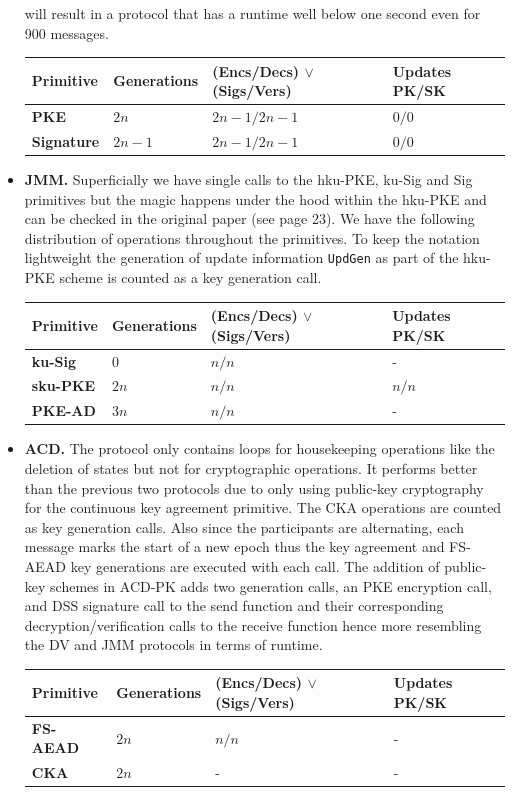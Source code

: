 \documentclass[11pt,a4paper,twoside,openright,bibliography=totoc]{scrbook}
\begin{document}
\begin{itemize}
  will result in a protocol that has a runtime well below one second
  even for 900 messages.
  \begin{center}
    \begin{tabular}{ | l | l | l | l |}
    \hline
    Primitive & Generations & (Encs/Decs) $\vee$ (Sigs/Vers) & Updates PK/SK \\ \hline
    \textbf{PKE} & $2n$ & $2n-1/2n-1$ & $0/0$ \\ \hline
    \textbf{Signature} & $2n-1$ & $2n-1/2n-1$ & $0/0$ \\  
    \hline
    \end{tabular}
  \end{center}
\item \textbf{JMM.} Superficially we have single calls to the hku-PKE, ku-Sig and
  Sig primitives but the magic happens under the hood within the hku-PKE and can
  be checked in the original paper (see page 23). We have the following distribution
  of operations throughout the primitives. To keep the notation lightweight
  the generation of update information \texttt{UpdGen} as part
  of the hku-PKE scheme is counted as a key generation call.
  \begin{center}
    \begin{tabular}{ | l | l | l | l |}
    \hline
    Primitive & Generations & (Encs/Decs) $\vee$ (Sigs/Vers) & Updates PK/SK \\ \hline
    \textbf{ku-Sig} & $0$ & $n/n$ & - \\ \hline
    \textbf{sku-PKE} & $2n$ & $n/n$ & $n/n$ \\ \hline
    \textbf{PKE-AD} & $3n$ & $n/n$ & - \\
    \hline
    \end{tabular}
  \end{center}
\item \textbf{ACD.} The protocol only contains loops for housekeeping operations
  like the deletion of states but not for cryptographic operations. It performs
  better than the previous two protocols due to only using public-key cryptography
  for the continuous key agreement primitive. The CKA operations are counted
  as key generation calls. Also since the participants are alternating,
  each message marks the start of a new epoch thus the key agreement and
  FS-AEAD key generations are executed with each call. The addition
  of public-key schemes in ACD-PK adds two generation calls, an PKE encryption call,
  and DSS signature call to the send function and their corresponding
  decryption/verification calls to the receive function hence more
  resembling the DV and JMM protocols in terms of runtime.
  \begin{center}
    \begin{tabular}{ | l | l | l | l |}
    \hline
    Primitive & Generations & (Encs/Decs) $\vee$ (Sigs/Vers) & Updates PK/SK \\ \hline
    \textbf{FS-AEAD} & $2n$ & $n/n$ & - \\ \hline
    \textbf{CKA} & $2n$ & - & - \\  
    \hline
    \end{tabular}
  \end{center}
\end{itemize}
\end{document}

